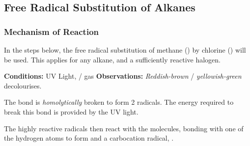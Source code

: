 		\subsection{Free Radical Substitution of Alkanes}

		\subsubsection{Mechanism of Reaction}

			In the steps below, the free radical substitution of methane () by chlorine () will be used. This applies
			for any alkane, and a sufficiently reactive halogen.

			\vspace{1.5em}

			\vbox{\textbf{Conditions:} \tabto{35mm}UV Light,  /  gas}	%
			\vbox{\textbf{Observations:} \tabto{35mm}\textit{\color{Mahogany}Reddish-brown}  / \textit{\color{YellowGreen}yellowish-green}  decolourises.}


				The \ch{\chlorine-\chlorine} bond is \textit{homolytically} broken to form 2 \ch{\chlorine} radicals.
				The energy required to break this bond is provided by the UV light.




				The highly reactive \ch{\chlorine} radicals then react with the  molecules, bonding with one of the
				hydrogen atoms to form  and a carbocation radical, .


